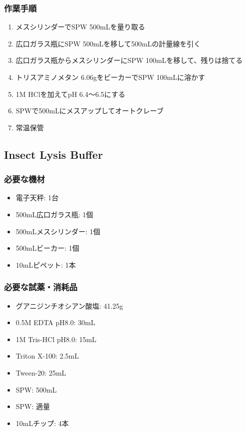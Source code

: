 \documentclass[titlepage,10pt,a4paper,uplatex]{jsbook}
\begin{document}
\subsubsection{作業手順}
\begin{enumerate}
\item メスシリンダーでSPW 500mLを量り取る
\item 広口ガラス瓶にSPW 500mLを移して500mLの計量線を引く
\item 広口ガラス瓶からメスシリンダーにSPW 100mLを移して、残りは捨てる
\item トリスアミノメタン 6.06gをビーカーでSPW 100mLに溶かす
\item 1M HClを加えてpH 6.4～6.5にする
\item SPWで500mLにメスアップしてオートクレーブ
\item 常温保管
\end{enumerate}

\subsection{Insect Lysis Buffer}

\subsubsection{必要な機材}
\begin{itemize}
\item 電子天秤: 1台
\item 500mL広口ガラス瓶: 1個
\item 500mLメスシリンダー: 1個
\item 500mLビーカー: 1個
\item 10mLピペット: 1本
\end{itemize}

\subsubsection{必要な試薬・消耗品}
\begin{itemize}
\item グアニジンチオシアン酸塩: 41.25g
\item 0.5M EDTA pH8.0: 30mL
\item 1M Tris-HCl pH8.0: 15mL
\item Triton X-100: 2.5mL
\item Tween-20: 25mL
\item SPW: 500mL
\item SPW: 適量
\item 10mLチップ: 4本
\end{itemize}
\end{document}
